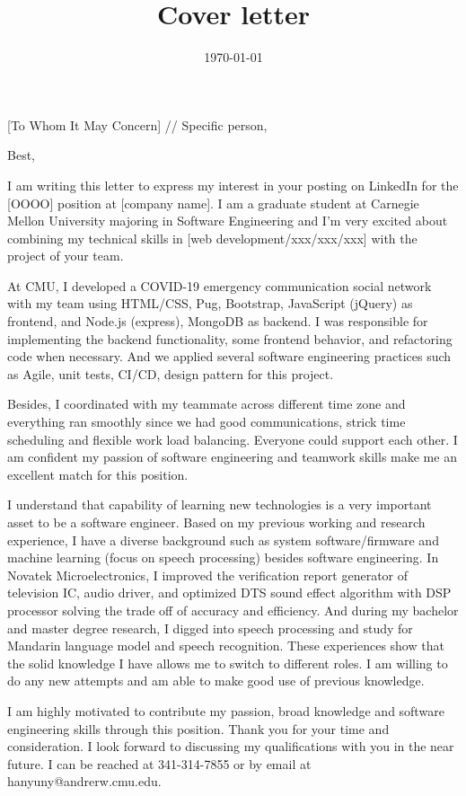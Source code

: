 \documentclass[11pt,a4paper,roman]{moderncv}        %
\title{Cover letter}                               %
\begin{document}
\recipient{\ }{}
\date{\today}
\opening{[To Whom It May Concern] // Specific person,}
\closing{Best,}
\makelettertitle

I am writing this letter to express my interest in your posting on LinkedIn 
for the [OOOO] position at [company name]. 
I am a graduate student at Carnegie Mellon University majoring in Software Engineering 
and I'm very excited about combining my technical skills in 
[web development/xxx/xxx/xxx] with the project of your team.

At CMU, I developed a COVID-19 emergency communication social network with my team using HTML/CSS, Pug, Bootstrap, JavaScript
(jQuery) as frontend, and Node.js (express), MongoDB as backend.
I was responsible for implementing the backend functionality, some frontend behavior, 
and refactoring code when necessary.
And we applied several software engineering practices such as Agile, unit tests, 
CI/CD, design pattern for this project. 

Besides, I coordinated with my teammate across different time zone and everything ran smoothly since we had good communications, 
strick time scheduling and flexible work load balancing. 
Everyone could support each other. 
I am confident my passion of software engineering and teamwork skills make me an excellent match for this position.


I understand that capability of learning new technologies is a very important asset to be a software engineer.
Based on my previous working and research experience, I have a diverse background such as system software/firmware and machine learning (focus on speech processing) besides software engineering.
In Novatek Microelectronics, I improved the verification report generator of television IC, audio driver, and optimized DTS sound effect algorithm with DSP processor solving the trade off of accuracy and efficiency.
And during my bachelor and master degree research, I digged into speech processing and study for Mandarin language model and speech recognition.
These experiences show that the solid knowledge I have allows me to switch to different roles.
I am willing to do any new attempts and am able to make good use of previous knowledge.

I am highly motivated to contribute my passion, broad knowledge and software engineering skills through this position.
Thank you for your time and consideration. 
I look forward to discussing my qualifications with you in the near future.
I can be reached at 341-314-7855 or by email at hanyuny@andrerw.cmu.edu.

\vspace{0.5cm}


\makeletterclosing
\end{document}
